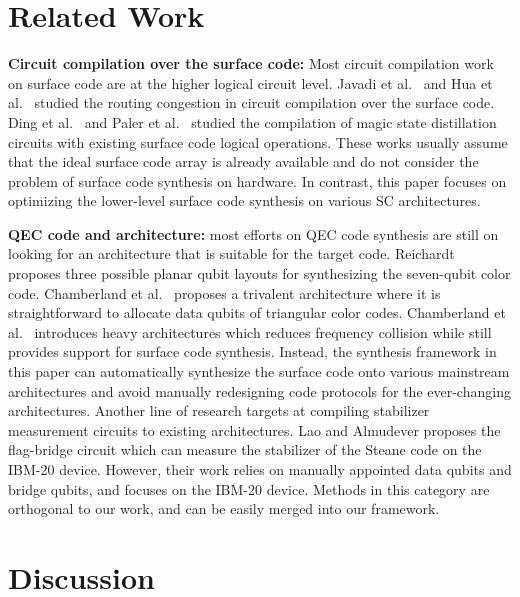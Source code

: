 
\section{Related Work}





\textbf{Circuit compilation over the surface code:}
Most circuit compilation work on surface code are at the higher logical circuit level.
Javadi et al.~\cite{JavadiAbhari2017OptimizedSC} and Hua et al.~\cite{Hua2021AutoBraidAF} studied the routing congestion in circuit compilation over the surface code.
Ding et al.~\cite{Ding2018MagicStateFU} and Paler et al.~\cite{Paler2019SurfBraidAC} studied the compilation of magic state distillation circuits with existing surface code logical operations. %
These works %
usually assume that the ideal surface code array is already available and do not consider the problem of surface code synthesis on hardware.
In contrast, this paper focuses on optimizing the lower-level surface code synthesis on various SC architectures.

\textbf{QEC code and architecture:}
most efforts on QEC code synthesis are still on looking for an architecture that is suitable for the target code.
Reichardt~\cite{Reichardt2018FaulttolerantQE} proposes three possible planar qubit layouts for synthesizing the seven-qubit color code.
Chamberland et al.~\cite{Chamberland2019TriangularCC} proposes a trivalent architecture where it is straightforward to allocate data qubits of triangular color codes. 
Chamberland et al.~\cite{Chamberland2020TopologicalAS} introduces heavy architectures which reduces frequency collision while still provides support for surface code synthesis. Instead, the synthesis framework in this paper can automatically synthesize the surface code onto various mainstream architectures and avoid manually redesigning code protocols for the ever-changing architectures.
Another line of research targets at compiling stabilizer measurement circuits to existing architectures.
Lao and Almudever \cite{Lao2020FaulttolerantQE} proposes the flag-bridge circuit which can measure the stabilizer of the Steane code on the IBM-20 device. However, their work relies on manually appointed data qubits and bridge qubits, and focuses on the IBM-20 device. Methods in this category are orthogonal to our work, and can be easily merged into our framework. 






\section{Discussion}

